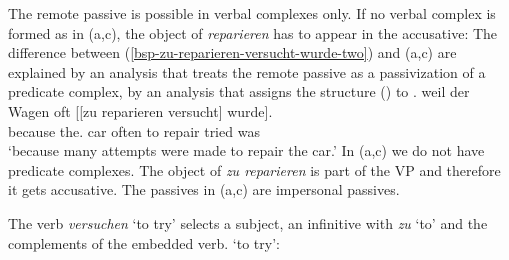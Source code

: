The remote passive is possible in verbal complexes only. If no verbal complex is formed as in
(a,c), the object of \emph{reparieren} has to appear in the accusative:
\eal
{}
\zl
The difference between (\ref{bsp-zu-reparieren-versucht-wurde-two}) and (a,c) are explained by an analysis that treats the remote passive as a passivization
of a predicate complex, \ie by an analysis that assigns the structure () to .
\ea
\gll weil    der        Wagen oft   [[zu reparieren versucht] wurde].\\
     because the.\NOM{} car   often \hphantom{[[}to repair   tried     was\\
\glt `because many attempts were made to repair the car.'\label{bsp-zu-reparieren-versucht-wurde-three}
%
\z
In (a,c) we do not have predicate complexes. The object of \emph{zu reparieren} is part of the VP
and therefore it gets accusative. The passives in (a,c) are impersonal passives.


The verb \emph{versuchen} `to try' selects a subject, an infinitive with \emph{zu} `to' and the
complements of the embedded verb.
\ea
{} `to try':\\
\z

